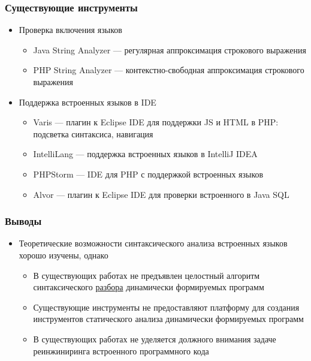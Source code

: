 \documentclass{beamer}
\begin{document}
\begin{frame}
    \transwipe[direction=90]
    \frametitle{Существующие инструменты}
    \begin{itemize}
        \item Проверка включения языков 
        \begin{itemize}
            \item Java String Analyzer --- регулярная аппроксимация строкового выражения
            \item PHP String Analyzer --- контекстно-свободная аппроксимация строкового выражения
        \end{itemize}
        \item Поддержка встроенных языков в IDE
        \begin{itemize}
            \item Varis --- плагин к Eclipse IDE для поддержки JS и HTML в PHP: подсветка синтаксиса, навигация
            \item IntelliLang --- поддержка встроенных языков в IntelliJ IDEA
            \item PHPStorm --- IDE для PHP с поддержкой встроенных языков
            \item Alvor --- плагин к Eclipse IDE для проверки встроенного в Java SQL 
        \end{itemize}        
    \end{itemize}
\end{frame}


\begin{frame}
    \transwipe[direction=90]
    \frametitle{Выводы}
    \begin{itemize}
      \item Теоретические возможности синтаксического анализа встроенных языков хорошо изучены, однако
      \begin{itemize}
        \item В существующих работах не предъявлен целостный алгоритм синтаксического \underline{разбора} динамически формируемых программ
        \item Существующие инструменты не предоставляют платформу для создания инструментов статического анализа динамически формируемых программ
        \item В существующих работах не уделяется должного внимания задаче реинжиниринга встроенного программного кода
      \end{itemize}
    \end{itemize}
\end{frame}
\end{document}
